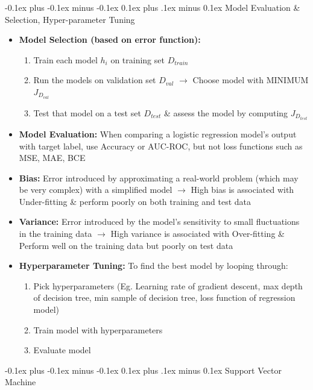 \documentclass[landscape]{article}
\makeatletter
\renewcommand{\section}{\@startsection{section}{1}{0mm}%
  {-0.1ex plus -0.1ex minus -0.1ex}%
  {0.1ex plus .1ex minus 0.1ex}%
{\normalfont\small\bfseries}}
\renewcommand{\subsection}{\@startsection{subsection}{2}{0mm}%
  {-0.1ex plus -0.1ex minus -0.1ex}%
  {0.1ex plus .1ex minus 0.1ex}%
{\normalfont\scriptsize\bfseries}}
\makeatother
\begin{document}
\begin{multicols*}{5}
        \subsection{Model Evaluation \& Selection, Hyper-parameter Tuning}
        \begin{itemize}
          \item \textbf{Model Selection (based on error function):}
          \begin{enumerate}
            \item Train each model $h_i$ on training set $D_{train}$
            \item Run the models on validation set $D_{val}$ $\rightarrow$ Choose model with MINIMUM $J_{D_{val}}$
            \item Test that model on a test set $D_{test}$ \& assess the model by computing $J_{D_{test}}$
          \end{enumerate}
          \item \textbf{Model Evaluation:} When comparing a logistic regression model's output with target label, use Accuracy or AUC-ROC, but not loss functions such as MSE, MAE, BCE
          \item \textbf{Bias:} Error introduced by approximating a real-world problem (which may be very complex) with a simplified model $\rightarrow$ High bias is associated with Under-fitting \& perform poorly on both training and test data
          \item \textbf{Variance:} Error introduced by the model's sensitivity to small fluctuations in the training data $\rightarrow$ High variance is associated with Over-fitting \& Perform well on the training data but poorly on test data
          \item \textbf{Hyperparameter Tuning:} To find the best model by looping through:
          \begin{enumerate}
            \item Pick hyperparameters (Eg. Learning rate of gradient descent, max depth of decision tree, min sample of decision tree, loss function of regression model)
            \item Train model with hyperparameters
            \item Evaluate model
          \end{enumerate}
        \end{itemize}

        \section{Support Vector Machine}

\end{multicols*}
\end{document}
